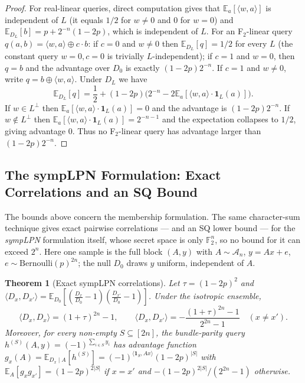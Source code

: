 \documentclass[11pt,a4paper]{article}
\theoremstyle{plain}
\newtheorem{theorem}{Theorem}[section]
\theoremstyle{definition}
\newcommand{\F}{\mathbb{F}}
\newcommand{\E}{\mathbb{E}}
\begin{document}
\begin{proof}
For real-linear queries, direct computation gives that $\E_a[\langle w,a\rangle]$ is independent of $L$ (it equals $1/2$ for $w \neq 0$ and $0$ for $w=0$) and $\E_{D_L}[b]=p+2^{-n}(1-2p)$, which is independent of $L$. For an F$_2$-linear query $q(a,b)=\langle w,a\rangle\oplus c\cdot b$: if $c=0$ and $w\neq 0$ then $\E_{D_L}[q]=1/2$ for every $L$ (the constant query $w=0,c=0$ is trivially $L$-independent); if $c=1$ and $w=0$, then $q=b$ and the advantage over $D_0$ is exactly $(1-2p)2^{-n}$. If $c=1$ and $w\neq 0$, write $q=b\oplus\langle w,a\rangle$. Under $D_L$ we have
\[
\E_{D_L}[q] = \frac12 + (1-2p)\bigl(2^{-n}-2\E_a[\langle w,a\rangle\cdot\mathbf 1_L(a)]\bigr).
\]
If $w\in L^\perp$ then $\E_a[\langle w,a\rangle\cdot\mathbf 1_L(a)]=0$ and the advantage is $(1-2p)2^{-n}$. If $w\notin L^\perp$ then $\E_a[\langle w,a\rangle\cdot\mathbf 1_L(a)]=2^{-n-1}$ and the expectation collapses to $1/2$, giving advantage $0$. Thus no F$_2$-linear query has advantage larger than $(1-2p)2^{-n}$.
\end{proof}

\subsection{The sympLPN Formulation: Exact Correlations and an SQ Bound}
\label{subsec:symplpn-sq}

The bounds above concern the membership formulation. The same character-sum technique gives exact pairwise correlations --- and an SQ lower bound --- for the \emph{sympLPN} formulation itself, whose secret space is only $\F_2^n$, so no bound for it can exceed $2^n$. Here one sample is the full block $(A, y)$ with $A \sim \mathcal{A}_n$, $y = Ax + e$, $e \sim \mathrm{Bernoulli}(p)^{2n}$; the null $D_0$ draws $y$ uniform, independent of $A$.

\begin{theorem}[Exact sympLPN correlations]
\label{thm:symplpn-corr}
Let $\tau = (1-2p)^2$ and $\langle D_x, D_{x'} \rangle = \E_{D_0}[(\tfrac{D_x}{D_0}-1)(\tfrac{D_{x'}}{D_0}-1)]$. Under the isotropic ensemble,
\[
\langle D_x, D_x \rangle = (1+\tau)^{2n} - 1, \qquad
\langle D_x, D_{x'} \rangle = -\frac{(1+\tau)^{2n}-1}{2^{2n}-1} \quad (x \neq x').
\]
Moreover, for every non-empty $S \subseteq [2n]$, the bundle-parity query $h^{(S)}(A,y) = (-1)^{\sum_{i \in S} y_i}$ has advantage function $g_x(A) = \E_{D_x \mid A}[h^{(S)}] = (-1)^{\langle \mathbf 1_S, Ax\rangle}(1-2p)^{|S|}$ with $\E_A[g_x g_{x'}] = (1-2p)^{2|S|}$ if $x = x'$ and $-(1-2p)^{2|S|}/(2^{2n}-1)$ otherwise.
\end{theorem}
\end{document}
